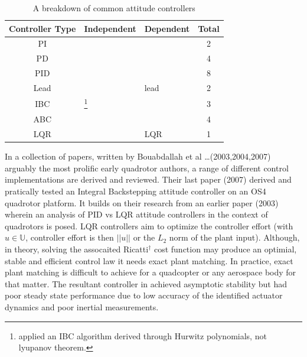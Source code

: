 \begin{table}[h]
\centering
\begin{tabular}{ |c|l|l|c| }
\hline
Controller Type & Independent & Dependent & Total\\ \hline
PI & \cite{attitudecontrolproblem} & \cite{attitudecontrolproblem} & 2\\ \hline
PD & \cite{modelingquadcopter, tiltrihani} & \cite{fullquaternion,singleaxistilting} & 4\\ \hline
PID & \cite{optimizedpidquadcopter, attitudecontrolproblem, quaddynamics, tiltpropellercontrol, pidlqr} & \cite{attitudecontrolproblem, starmac, adaptivedisturbancecontrol} & 8\\ \hline
Lead & \cite{x4flyer, dynamicmodelling2009} & lead & 2\\ \hline
IBC & \cite{tpheonix, backsteppingquadcoptercontrol}\footnote{\cite{tpheonix} applied an IBC algorithm derived through Hurwitz polynomials, not lyupanov theorem.} & \cite{backsteppingquadcoptercontrol} & 3\\ \hline
ABC & \multicolumn{2}{l|}{\cite{adaptivebackstep, nonlinearadaptive, 6dofbackstep, intelligentbackstep}} & 4\\ \hline
LQR & \cite{pidlqr} & LQR & 1\\ \hline
\end{tabular}
\caption{A breakdown of common attitude controllers}
\label{tab:controllers}
\end{table}
\par
In a collection of papers, written by Bouabdallah et al \ldots (2003,2004,2007) arguably the most prolific early quadrotor authors, a range of different control implementations are derived and reviewed. Their last paper (2007)\cite{fullquadcoptercontrol} derived and pratically tested an Integral Backstepping attitude controller on an OS4 quadrotor platform. It builds on their research from an earlier paper (2003)\cite{pidlqr} wherein an analysis of PID vs LQR attitude controllers in the context of quadrotors is posed. LQR controllers aim to optimize the controller effort (with $u\in\mathbb{U}$, controller effort is then $||u||$ or the $L_2$ norm of the plant input). Although, in theory, solving the assocaited Ricatti$^{\dagger}$ cost function may produce an optimial, stable and efficient control law it needs exact plant matching. In practice, exact plant matching is difficult to achieve for a quadcopter or any aerospace body for that matter. The resultant controller in \cite{pidlqr} achieved asymptotic stability but had poor steady state performance due to low accuracy of the identified actuator dynamics and poor inertial measurements.
